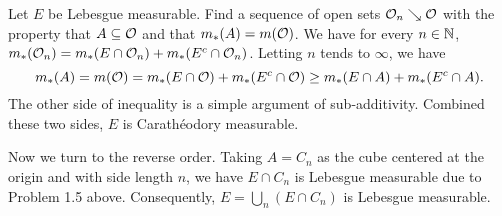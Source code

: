 \begin{Solution}
  Let $E$ be Lebesgue measurable. Find a sequence of open sets $\mathcal{O}_n\searrow \mathcal{O}$ with the property that $A\subseteq \mathcal{O}$ and that $m_*(A)=m(\mathcal{O})$. We have for every $n\in\mathbb{N}$, $m_*(\mathcal{O}_n)=m_*(E\cap\mathcal{O}_n)+m_*(E^c\cap\mathcal{O}_n)$. Letting $n$ tends to $\infty$, we have
  $$
  m_*(A)=m(\mathcal{O})=m_*(E\cap \mathcal{O})+m_*(E^c\cap \mathcal{O})\geq m_*(E\cap A)+m_*(E^c\cap A).
  $$
  The other side of inequality is a simple argument of sub-additivity. Combined these two sides, $E$ is Carath\'eodory measurable.

  Now we turn to the reverse order. Taking $A=C_n$ as the cube centered at the origin and with side length $n$, we have $E\cap C_n$ is Lebesgue measurable due to Problem 1.5 above. Consequently, $E=\bigcup_n(E\cap C_n)$ is Lebesgue measurable.
\end{Solution}
